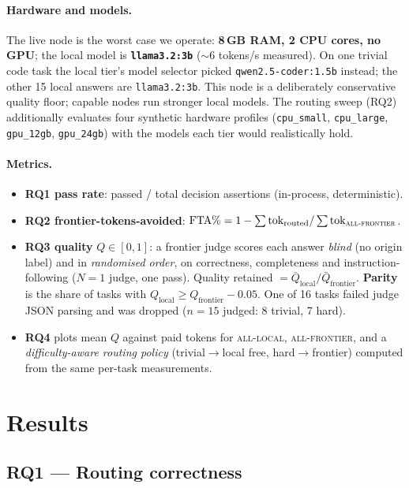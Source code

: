 \documentclass[10pt]{article} %
\begin{document}
\paragraph{Hardware and models.} The live node is the worst case we operate: \textbf{8\,GB RAM, 2 CPU cores, no GPU}; the local model is \textbf{\texttt{llama3.2:3b}} ($\sim$6 tokens/s measured). On one trivial code task the local tier's model selector picked \texttt{qwen2.5-coder:1.5b} instead; the other 15 local answers are \texttt{llama3.2:3b}. This node is a deliberately conservative quality floor; capable nodes run stronger local models. The routing sweep (RQ2) additionally evaluates four synthetic hardware profiles (\texttt{cpu\_small}, \texttt{cpu\_large}, \texttt{gpu\_12gb}, \texttt{gpu\_24gb}) with the models each tier would realistically hold.

\paragraph{Metrics.}
\begin{itemize}
  \item \textbf{RQ1 pass rate}: passed / total decision assertions (in-process, deterministic).
  \item \textbf{RQ2 frontier-tokens-avoided}: $\mathrm{FTA}\% = 1 - \sum \mathrm{tok}_{\mathrm{routed}} / \sum \mathrm{tok}_{\textsc{all-frontier}}$.
  \item \textbf{RQ3 quality} $Q \in [0,1]$: a frontier judge scores each answer \emph{blind} (no origin label) and in \emph{randomised order}, on correctness, completeness and instruction-following ($N{=}1$ judge, one pass). Quality retained $= \bar{Q}_{\mathrm{local}} / \bar{Q}_{\mathrm{frontier}}$. \textbf{Parity} is the share of tasks with $Q_{\mathrm{local}} \geq Q_{\mathrm{frontier}} - 0.05$. One of 16 tasks failed judge JSON parsing and was dropped ($n{=}15$ judged: 8 trivial, 7 hard).
  \item \textbf{RQ4} plots mean $Q$ against paid tokens for \textsc{all-local}, \textsc{all-frontier}, and a \emph{difficulty-aware routing policy} (trivial${\to}$local free, hard${\to}$frontier) computed from the same per-task measurements.
\end{itemize}

\section{Results}
\label{sec:results}

\subsection{RQ1 --- Routing correctness}
\label{sec:rq1}
\end{document}
